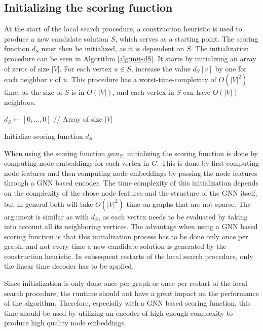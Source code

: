 \documentclass[draft,final]{vutinfth} %
\begin{document}
\subsection{Initializing the scoring function}
At the start of the local search procedure, a construction heuristic is used to produce a new candidate solution $S$, which serves as a starting point. 
The scoring function $d_S$ must then be initialized, as it is dependent on $S$. The initialization procedure can be seen in Algorithm \ref{alg:init-dS}.
It starts by initializing an array of zeros of size $|V|$. For each vertex $u \in S$, increase the value $d_S[v]$ by one for each neighbor $v$ of $u$. This procedure has a worst-time-complexity of $O(|V|^2)$ time, as the size of $S$ is in $O(|V|)$, and each vertex in $S$ can have $O(|V|)$ neighbors. 

\begin{algorithm}
    \DontPrintSemicolon
    $d_S \gets [0, \dots, 0]$ // Array of size $|V|$ \;
    \caption{Initialize scoring function $d_S$}
    \label{alg:init-dS}
\end{algorithm}

When using the scoring function $gnn_S$, initializing the scoring function is done by computing node embeddings for each vertex in $G$. This is done by first computing node features and then computing node embeddings by passing the node features through a GNN based encoder. The time complexity of this initialization depends on the complexity of the chose node features and the structure of the GNN itself, but in general both will take $O(|V|^2)$ time on graphs that are not sparse. The argument is similar as with $d_S$, as each vertex needs to be evaluated by taking into account all its neighboring vertices. 
The advantage when using a GNN based scoring function is that this initialization process has to be done only once per graph, and not every time a new candidate solution is generated by the construction heuristic. In subsequent restarts of the local search procedure, only the linear time decoder has to be applied. 

Since initialization is only done once per graph or once per restart of the local search procedure, the runtime should not have a great impact on the performance of the algorithm. Therefore, especially with a GNN based scoring function, this time should be used by utilizing an encoder of high enough complexity to produce high quality node embeddings. 
\end{document}

